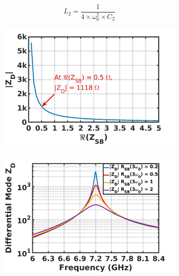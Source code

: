 \documentclass[conference]{IEEEtran}
\begin{document}
\vspace{-0.05in}
\begin{equation}
    L_2=\frac{1}{4\times\omega_0^2\times C_2}%
    \label{eqn:Design_A_2H}
\end{equation}

\begin{figure}[!t]
\captionsetup{font=footnotesize}
\centering
\begin{subfigure}{0.24\textwidth}
\includegraphics[width=1\textwidth]{Images/Design/Design_A_Zn_3H.jpg}
\caption{}
\label{fig:Design_A_Zn_3H}
\end{subfigure}
\begin{subfigure}{0.24\textwidth}
\includegraphics[width=1\textwidth]{Images/Design/Design_A_Rn_var_3H.jpg}
\caption{}
\label{fig:Design_A_Rn_var_3H}
\end{subfigure}

\end{figure}
\end{document}
